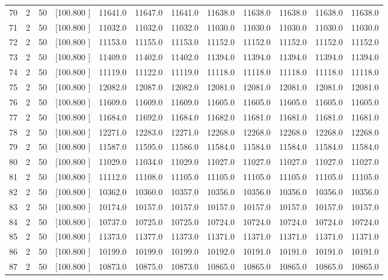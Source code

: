 \documentclass[12pt,a4paper]{article}
\begin{document}
\begin{center}
{\begin{tabular}{r r r r r r r r r r r r}
  70&  2& 50&[100.800   ]& 11641.0& 11647.0& 11641.0& 11638.0& 11638.0& 11638.0& 11638.0& 11638.0\\[-0.02in]
  71&  2& 50&[100.800   ]& 11032.0& 11032.0& 11032.0& 11030.0& 11030.0& 11030.0& 11030.0& 11030.0\\[-0.02in]
  72&  2& 50&[100.800   ]& 11153.0& 11155.0& 11153.0& 11152.0& 11152.0& 11152.0& 11152.0& 11152.0\\[-0.02in]
  73&  2& 50&[100.800   ]& 11409.0& 11402.0& 11402.0& 11394.0& 11394.0& 11394.0& 11394.0& 11394.0\\[-0.02in]
  74&  2& 50&[100.800   ]& 11119.0& 11122.0& 11119.0& 11118.0& 11118.0& 11118.0& 11118.0& 11118.0\\[-0.02in]
  75&  2& 50&[100.800   ]& 12082.0& 12087.0& 12082.0& 12081.0& 12081.0& 12081.0& 12081.0& 12081.0\\[-0.02in]
  76&  2& 50&[100.800   ]& 11609.0& 11609.0& 11609.0& 11605.0& 11605.0& 11605.0& 11605.0& 11605.0\\[-0.02in]
  77&  2& 50&[100.800   ]& 11684.0& 11692.0& 11684.0& 11682.0& 11681.0& 11681.0& 11681.0& 11681.0\\[-0.02in]
  78&  2& 50&[100.800   ]& 12271.0& 12283.0& 12271.0& 12268.0& 12268.0& 12268.0& 12268.0& 12268.0\\[-0.02in]
  79&  2& 50&[100.800   ]& 11587.0& 11595.0& 11586.0& 11584.0& 11584.0& 11584.0& 11584.0& 11584.0\\[-0.02in]
  80&  2& 50&[100.800   ]& 11029.0& 11034.0& 11029.0& 11027.0& 11027.0& 11027.0& 11027.0& 11027.0\\[-0.02in]
  81&  2& 50&[100.800   ]& 11112.0& 11108.0& 11105.0& 11105.0& 11105.0& 11105.0& 11105.0& 11105.0\\[-0.02in]
  82&  2& 50&[100.800   ]& 10362.0& 10360.0& 10357.0& 10356.0& 10356.0& 10356.0& 10356.0& 10356.0\\[-0.02in]
  83&  2& 50&[100.800   ]& 10174.0& 10157.0& 10157.0& 10157.0& 10157.0& 10157.0& 10157.0& 10157.0\\[-0.02in]
  84&  2& 50&[100.800   ]& 10737.0& 10725.0& 10725.0& 10724.0& 10724.0& 10724.0& 10724.0& 10724.0\\[-0.02in]
  85&  2& 50&[100.800   ]& 11373.0& 11377.0& 11373.0& 11371.0& 11371.0& 11371.0& 11371.0& 11371.0\\[-0.02in]
  86&  2& 50&[100.800   ]& 10199.0& 10199.0& 10199.0& 10192.0& 10191.0& 10191.0& 10191.0& 10191.0\\[-0.02in]
  87&  2& 50&[100.800   ]& 10873.0& 10875.0& 10873.0& 10865.0& 10865.0& 10865.0& 10865.0& 10865.0\\[-0.02in]

\end{tabular}}
\end{center}
\end{document}
